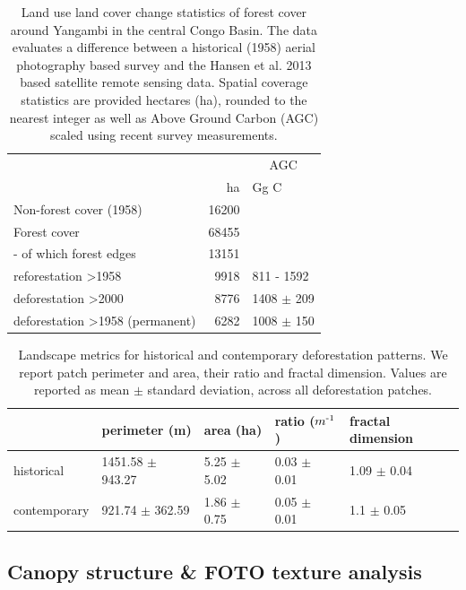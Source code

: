 \documentclass[remote sensing,article,submit,moreauthors,pdftex]{mdpi}
\begin{document}
\begin{table}[!h]

\caption{\label{tab:unnamed-chunk-10}Land use land cover change statistics of forest cover around Yangambi in the central Congo Basin. The data evaluates a difference between a historical (1958) aerial photography based survey and the Hansen et al. 2013 based satellite remote sensing data. Spatial coverage statistics are provided hectares (ha), rounded to the nearest integer as well as Above Ground Carbon (AGC) scaled using recent survey measurements.}
\centering
\begin{tabular}[t]{lrl}
\toprule
\multicolumn{2}{c}{ } & \multicolumn{1}{c}{AGC} \\
\cmidrule(l{3pt}r{3pt}){3-3}
  & ha & Gg C\\
\midrule
Non-forest cover (1958) & 16200 & \\
Forest cover & 68455 & \\
-  of which forest edges & 13151 & \\
reforestation >1958 & 9918 & 811 - 1592\\
deforestation >2000 & 8776 & 1408 $\pm$ 209\\
\addlinespace
deforestation >1958 (permanent) & 6282 & 1008 $\pm$ 150\\
\bottomrule
\end{tabular}
\end{table}

\begin{table}[!h]

\caption{\label{tab:unnamed-chunk-11}Landscape metrics for historical and contemporary deforestation patterns. We report patch perimeter and area, their ratio and fractal dimension. Values are reported as mean $\pm$ standard deviation, across all deforestation patches.}
\centering
\begin{tabular}[t]{lllll}
\toprule
  & perimeter (m) & area (ha) & ratio ($m\textsuperscript{-1}$) & fractal dimension\\
\midrule
historical & 1451.58 $\pm$ 943.27 & 5.25 $\pm$ 5.02 & 0.03 $\pm$ 0.01 & 1.09 $\pm$ 0.04\\
contemporary & 921.74 $\pm$ 362.59 & 1.86 $\pm$ 0.75 & 0.05 $\pm$ 0.01 & 1.1 $\pm$ 0.05\\
\bottomrule
\end{tabular}
\end{table}

\hypertarget{canopy-structure-foto-texture-analysis-1}{%
\subsection{Canopy structure \& FOTO texture
analysis}\label{canopy-structure-foto-texture-analysis-1}}
\end{document}
